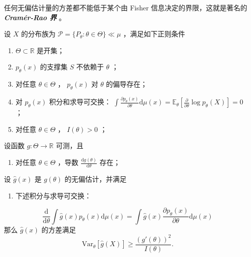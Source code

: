 任何无偏估计量的方差都不能低于某个由 Fisher 信息决定的界限，这就是著名的 \textbf{\emph{Cramér-Rao 界}} 。

\begin{theorem}
\label{thm:ch7:cramer-rao}

设 $X$ 的分布族为 $\mathscr{P}=\{P_\theta:\theta\in\Theta\}\ll \mu$ ，满足如下正则条件

\begin{enumerate}
\def\labelenumi{\arabic{enumi}.}
\tightlist
\item
  $\Theta\subset\mathbb R$ 是开集；
\item
  $p_\theta(x)$ 的支撑集 $S$ 不依赖于 $\theta$ ；
\item
  对任意 $\theta\in\Theta$ ， $p_\theta(x)$ 对 $\theta$ 的偏导存在；
\item
  对 $p_\theta(x)$ 积分和求导可交换： $\int\tfrac{\partial p_\theta(x)}{\partial\theta}\mathrm d\mu(x)=\mathbb E_\theta\left[\tfrac{\partial }{\partial\theta}\log p_\theta(X)\right]=0$ ；
\item
  对任意 $\theta\in\Theta$ ， $I(\theta)>0$ ；
\end{enumerate}

设函数 $g:\Theta\to\mathbb R$ 可测，且

\begin{enumerate}
\def\labelenumi{\arabic{enumi}.}
\setcounter{enumi}{5}
\tightlist
\item
  对任意 $\theta\in\Theta$ ，导数 $\tfrac{\mathrm d g(\theta)}{\mathrm d\theta}$ 存在；
\end{enumerate}

设 $\widehat g(x)$ 是 $g(\theta)$ 的无偏估计，并满足

\begin{enumerate}
\def\labelenumi{\arabic{enumi}.}
\setcounter{enumi}{6}
\tightlist
\item
  下述积分与求导可交换：
\end{enumerate}
\[\frac{\mathrm d}{\mathrm d \theta}\int\widehat g(x)p_\theta(x)\mathrm d\mu(x)=\int\widehat g(x)\frac{\partial p_\theta(x)}{\partial\theta}\mathrm d\mu(x)\]
那么 $\widehat g(x)$ 的方差满足
\[
\mathrm{Var}_\theta[\widehat g(X)]\ge\frac{(g'(\theta))^2}{I(\theta)}.
\]

\end{theorem}

